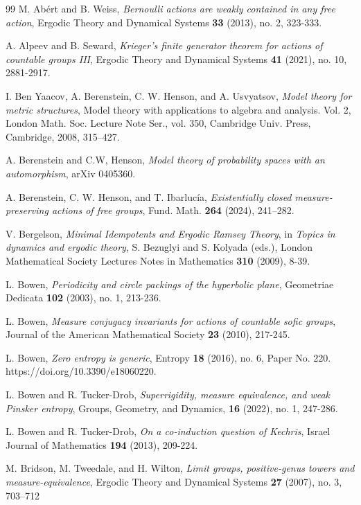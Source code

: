 \documentclass[12pt]{amsart}
\theoremstyle{definition}
\begin{document}
\begin{thebibliography}{99}
 M. Ab{\'e}rt and B. Weiss, \emph{Bernoulli actions are weakly contained in any free action}, Ergodic Theory and Dynamical Systems \textbf{33}  (2013), no. 2, 323-333. 

 A. Alpeev and B. Seward, \emph{Krieger's finite generator theorem for actions of countable groups III}, Ergodic Theory and Dynamical Systems \textbf{41} (2021), no. 10, 2881-2917.

 I. Ben Yaacov, A. Berenstein, C. W. Henson, and A. Usvyatsov, \emph{Model theory for metric structures}, Model theory with applications to algebra and analysis. Vol. 2, London Math. Soc. Lecture Note Ser., vol. 350, Cambridge Univ. Press, Cambridge, 2008, 315--427.

  A. Berenstein and C.W, Henson, \emph{Model theory of probability
spaces with an automorphism}, arXiv 0405360.


 A. Berenstein, C. W. Henson, and T. Ibarluc\'ia, \emph{Existentially closed measure-preserving actions of free groups}, Fund. Math. \textbf{264} (2024), 241–282.

 V. Bergelson, \emph{Minimal Idempotents and Ergodic Ramsey Theory}, in \emph{Topics in dynamics and ergodic theory}, S. Bezuglyi and S. Kolyada (eds.), London Mathematical Society Lectures Notes in Mathematics \textbf{310} (2009), 8-39.

 L. Bowen, \emph{Periodicity and circle packings of the hyperbolic plane}, Geometriae Dedicata \textbf{102} (2003), no. 1, 213-236.

 L. Bowen, \emph{Measure conjugacy invariants for actions of countable sofic groups}, Journal of the American Mathematical Society \textbf{23} (2010), 217-245.

 L. Bowen, \emph{Zero entropy is generic}, Entropy \textbf{18} (2016), no. 6, Paper No. 220. https://doi.org/10.3390/e18060220.

 L. Bowen and R. Tucker-Drob, \emph{Superrigidity, measure equivalence, and weak Pinsker entropy}, Groups, Geometry, and Dynamics, \textbf{16} (2022), no. 1, 247-286.

 L. Bowen and R. Tucker-Drob, \emph{On a co-induction question of Kechris}, Israel Journal of Mathematics \textbf{194} (2013), 209-224.

 M. Bridson, M. Tweedale, and H. Wilton, \emph{Limit groups, positive-genus towers and measure-equivalence},
Ergodic Theory and Dynamical Systems \textbf{27} (2007), no. 3, 703--712


\end{thebibliography}
\end{document}

